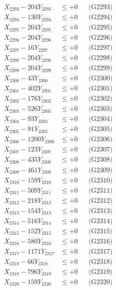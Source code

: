 \documentclass[a4paper,10pt]{article}
\begin{document}
{\begin{align}
X_{2293} - 204Y_{2293} &\leq +0 && \text{(G2293)} \\
X_{2294} - 130Y_{2294} &\leq +0 && \text{(G2294)} \\
X_{2295} - 204Y_{2295} &\leq +0 && \text{(G2295)} \\
X_{2296} - 204Y_{2296} &\leq +0 && \text{(G2296)} \\
X_{2297} - 16Y_{2297} &\leq +0 && \text{(G2297)} \\
X_{2298} - 204Y_{2298} &\leq +0 && \text{(G2298)} \\
X_{2299} - 204Y_{2299} &\leq +0 && \text{(G2299)} \\
X_{2300} - 43Y_{2300} &\leq +0 && \text{(G2300)} \\
\allowbreak
X_{2301} - 402Y_{2301} &\leq +0 && \text{(G2301)} \\
X_{2302} - 176Y_{2302} &\leq +0 && \text{(G2302)} \\
X_{2303} - 526Y_{2303} &\leq +0 && \text{(G2303)} \\
X_{2304} - 93Y_{2304} &\leq +0 && \text{(G2304)} \\
X_{2305} - 91Y_{2305} &\leq +0 && \text{(G2305)} \\
X_{2306} - 1200Y_{2306} &\leq +0 && \text{(G2306)} \\
X_{2307} - 123Y_{2307} &\leq +0 && \text{(G2307)} \\
X_{2308} - 435Y_{2308} &\leq +0 && \text{(G2308)} \\
X_{2309} - 461Y_{2309} &\leq +0 && \text{(G2309)} \\
X_{2310} - 159Y_{2310} &\leq +0 && \text{(G2310)} \\
\allowbreak
X_{2311} - 509Y_{2311} &\leq +0 && \text{(G2311)} \\
X_{2312} - 218Y_{2312} &\leq +0 && \text{(G2312)} \\
X_{2313} - 154Y_{2313} &\leq +0 && \text{(G2313)} \\
X_{2314} - 516Y_{2314} &\leq +0 && \text{(G2314)} \\
X_{2315} - 152Y_{2315} &\leq +0 && \text{(G2315)} \\
X_{2316} - 580Y_{2316} &\leq +0 && \text{(G2316)} \\
X_{2317} - 1171Y_{2317} &\leq +0 && \text{(G2317)} \\
X_{2318} - 66Y_{2318} &\leq +0 && \text{(G2318)} \\
X_{2319} - 796Y_{2319} &\leq +0 && \text{(G2319)} \\
X_{2320} - 159Y_{2320} &\leq +0 && \text{(G2320)} \\

\end{align}}
\end{document}
